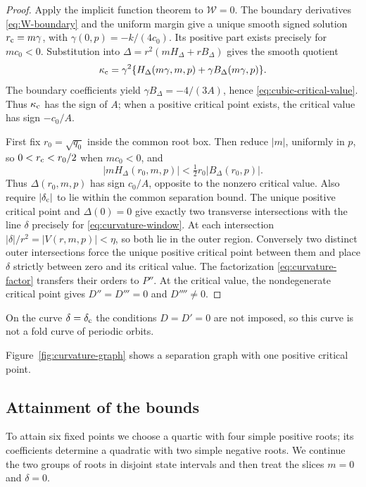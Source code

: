\begin{proof}
Apply the implicit function theorem to \(\mathcal W=0\).
The boundary derivatives \eqref{eq:W-boundary} and the uniform margin
give a unique smooth signed solution \(r_{\rm c}=m\gamma\), with
\(\gamma(0,p)=-k/(4c_0)\). Its positive part exists precisely for
\(mc_0<0\).
Substitution into \(\Delta=r^2(mH_\Delta+rB_\Delta)\) gives the smooth quotient
\[
 \kappa_{\rm c}=\gamma^2\{H_\Delta(m\gamma,m,p)+\gamma B_\Delta(m\gamma,p)\}.
\]
The boundary coefficients yield \(\gamma B_\Delta=-4/(3A)\), hence
\eqref{eq:cubic-critical-value}. Thus \(\kappa_{\rm c}\) has the sign of
\(A\); when a positive critical point exists, the critical value has sign
\(-c_0/A\).

First fix \(r_0=\sqrt{q_0}\) inside the common root box. Then reduce
\(|m|\), uniformly in \(p\), so \(0<r_{\rm c}<r_0/2\) when
\(mc_0<0\), and
\[
 |mH_\Delta(r_0,m,p)|<\tfrac12r_0|B_\Delta(r_0,p)|.
\]
Thus \(\Delta(r_0,m,p)\) has sign \(c_0/A\), opposite to the
nonzero critical value. Also require \(|\delta_{\rm c}|\) to lie
within the common separation bound. The unique positive critical point and
\(\Delta(0)=0\) give exactly two transverse intersections with the
line \(\delta\) precisely for \eqref{eq:curvature-window}.
At each intersection \(|\delta|/r^2=|V(r,m,p)|<\eta\), so both
lie in the outer region. Conversely two distinct outer
intersections force the unique positive critical point between them and place
\(\delta\) strictly between zero and its critical value.
The factorization \eqref{eq:curvature-factor} transfers their orders
to \(P''\). At the critical value, the nondegenerate critical point gives
\(D''=D'''=0\) and \(D''''\ne0\).
\end{proof}

On the curve \(\delta=\delta_{\rm c}\) the conditions \(D=D'=0\) are not
imposed, so this curve is not a fold curve of periodic orbits.

Figure~\ref{fig:curvature-graph} shows a separation graph with one
positive critical point.



\subsection{Attainment of the bounds}\label{subsec:single-scale-sharpness}

To attain six fixed points we choose a quartic with four simple positive
roots; its coefficients determine a quadratic with two simple negative roots.
We continue the two groups of roots in disjoint state intervals and then
treat the slices \(m=0\) and \(\delta=0\).

